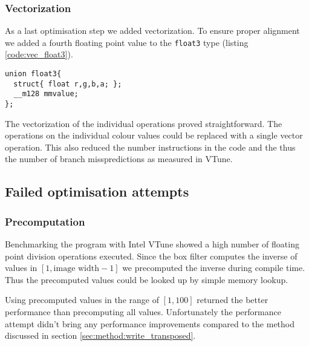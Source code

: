 \subsubsection{Vectorization}
As a last optimisation step we added vectorization. To ensure proper alignment we added a fourth floating point value to the \lstinline{float3} type (listing \ref{code:vec_float3}).
\begin{lstlisting}[label=Vectorized float3 type, label=code:vec_float3] 
union float3{
  struct{ float r,g,b,a; };
  __m128 mmvalue;
};
\end{lstlisting}
The vectorization of the individual operations proved straightforward. The operations on the individual colour values could be replaced with a single vector operation. This also reduced the number instructions in the code and the thus the number of branch misspredictions as measured in VTune.

\subsection{Failed optimisation attempts}

\subsubsection{Precomputation} 

Benchmarking the program with Intel VTune showed a high number of floating point division operations executed. Since the box filter computes the inverse of values in $[1,\text{image width}-1]$ we precomputed the inverse during compile time. Thus the precomputed values could be looked up by simple memory lookup. 

Using precomputed values in the range of $[1,100]$ returned the better performance than precomputing all values. Unfortunately the performance attempt didn't bring any performance improvements compared to the method discussed in section \ref{sec:method:write_transposed}.

%
%

